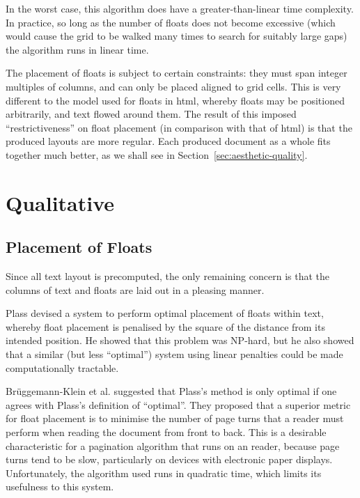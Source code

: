 In the worst case, this algorithm does have a greater-than-linear time complexity. In practice, so long as the number of floats does not become excessive (which would cause the grid to be walked many times to search for suitably large gaps) the algorithm runs in linear time.

The placement of floats is subject to certain constraints: they must span integer multiples of columns, and can only be placed aligned to grid cells. This is very different to the model used for floats in \gls{html}, whereby floats may be positioned arbitrarily, and text flowed around them. The result of this imposed ``restrictiveness'' on float placement (in comparison with that of \gls{html}) is that the produced layouts are more regular. Each produced document as a whole fits together much better, as we shall see in Section~\ref{sec:aesthetic-quality}.


\newpage

\section{Qualitative}
\label{sec:aesthetics}

\subsection{Placement of Floats}
Since all text layout is precomputed, the only remaining concern is that the columns of text and floats are laid out in a pleasing manner.

Plass\hspace{0pt}\cite{Plass1981} devised a system to perform optimal placement of floats within text, whereby float placement is penalised by the square of the distance from its intended position. He showed that this problem was NP-hard, but he also showed that a similar (but less ``optimal'') system using linear penalties could be made computationally tractable.

Br\"uggemann-Klein et al.\hspace{0pt}\cite{Bruggemann-Klein1995} suggested that Plass's method is only optimal if one agrees with Plass's definition of ``optimal''. They proposed that a superior metric for float placement is to minimise the number of page turns that a reader must perform when reading the document from front to back. This is a desirable characteristic for a pagination algorithm that runs on an \ebook{} reader, because page turns tend to be slow, particularly on devices with electronic paper displays. Unfortunately, the algorithm used runs in quadratic time, which limits its usefulness to this system.

